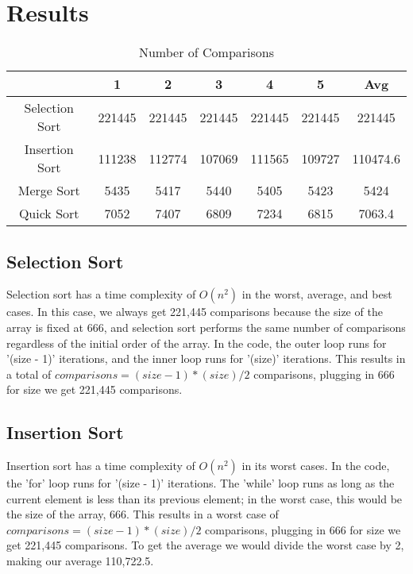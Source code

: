 \documentclass[letterpaper, 10pt,DIV=13]{scrartcl}
\numberwithin{equation}{section} %
\numberwithin{figure}{section} %
\numberwithin{table}{section} %
\begin{document}

\pagebreak


\section{Results}

\begin{table}[H]
\centering
\caption{Number of Comparisons}
\begin{tabular}{|c|c|c|c|c|c|c|}
\hline
 & 1 & 2 & 3 & 4 & 5 & Avg \\
\hline
Selection Sort & 221445 & 221445 & 221445 & 221445 & 221445 & 221445 \\
\hline
Insertion Sort & 111238 & 112774 & 107069 & 111565 & 109727 & 110474.6 \\
\hline
Merge Sort & 5435 & 5417 & 5440 & 5405 & 5423 & 5424 \\
\hline
Quick Sort & 7052 & 7407 & 6809 & 7234 & 6815 & 7063.4 \\
\hline
\end{tabular}
\end{table}

\subsection{Selection Sort}
Selection sort has a time complexity of $O(n^2)$ in the worst, average, and best cases. In this case, we always get 221,445 comparisons because the size of the array is fixed at 666, and selection sort performs the same number of comparisons regardless of the initial order of the array. In the code, the outer loop runs for '(size - 1)' iterations, and the inner loop runs for '(size)' iterations. This results in a total of $comparisons = (size - 1) * (size) / 2$ comparisons, plugging in 666 for size we get 221,445 comparisons.
\subsection{Insertion Sort} 
Insertion sort has a time complexity of $O(n^2)$ in its worst cases. In the code, the 'for' loop runs for '(size - 1)' iterations. The 'while' loop runs as long as the current element is less than its previous element; in the worst case, this would be the size of the array, 666. This results in a worst case of $comparisons = (size - 1) * (size) / 2$ comparisons,  plugging in 666 for size we get 221,445 comparisons. To get the average we would divide the worst case by 2, making our average 110,722.5.
\end{document}
